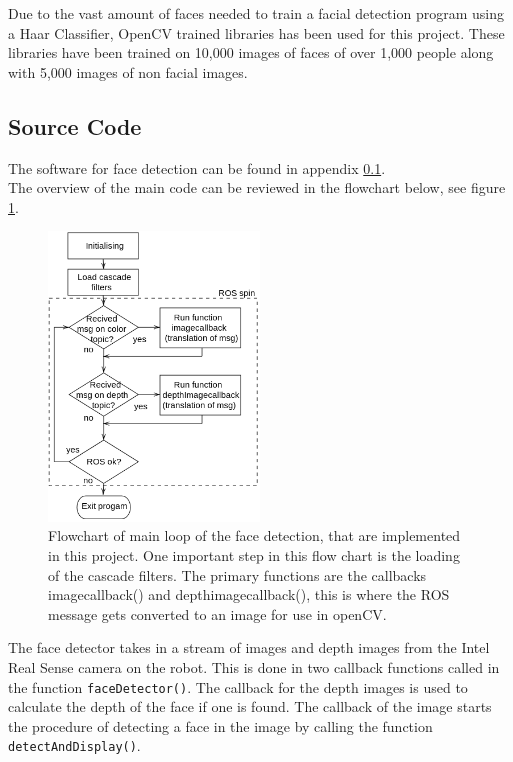 Due to the vast amount of faces needed to train a facial detection program using a Haar Classifier, OpenCV trained libraries has been used for this project. These libraries have been trained on 10,000 images of faces of over 1,000 people along with 5,000 images of non facial images.\cite{wilson2006facial}\\

\subsection{Source Code}
The software for face detection can be found in appendix \ref{}.\\
The overview of the main code can be reviewed in the flowchart below, see figure \ref{fig:flowchartFaceMain}.
\begin{figure}[H]
    \centering
    \includegraphics[width=0.5\textwidth]{figures/main_face_flow.png}
    \caption{Flowchart of main loop of the face detection, that are implemented in this project. One important step in this flow chart is the loading of the cascade filters. The primary functions are the callbacks imagecallback() and depthimagecallback(), this is where the ROS message gets  converted to an image for use in openCV.}
    \label{fig:flowchartFaceMain}
\end{figure}

The face detector takes in a stream of images and depth images from the Intel Real Sense camera on the robot. This is done in two callback functions called in the function \texttt{faceDetector()}. The callback for the depth images is used to calculate the depth of the face if one is found. The callback of the image starts the procedure of detecting a face in the image by calling the function \texttt{detectAndDisplay()}.\\

